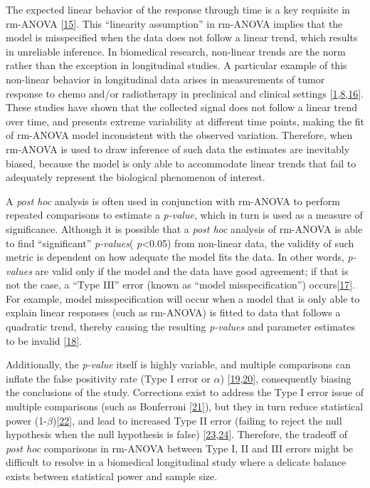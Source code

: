 \documentclass[
]{article}
\begin{document}
The expected linear behavior of the response through time is a key requisite in rm-ANOVA {[}\protect\hyperlink{ref-pinheiro2006}{15}{]}. This ``linearity assumption'' in rm-ANOVA implies that the model is misspecified when the data does not follow a linear trend, which results in unreliable inference. In biomedical research, non-linear trends are the norm rather than the exception in longitudinal studies. A particular example of this non-linear behavior in longitudinal data arises in measurements of tumor response to chemo and/or radiotherapy in preclinical and clinical settings {[}\protect\hyperlink{ref-roblyer2011}{1},\protect\hyperlink{ref-skala2010}{8},\protect\hyperlink{ref-vishwanath2009}{16}{]}. These studies have shown that the collected signal does not follow a linear trend over time, and presents extreme variability at different time points, making the fit of rm-ANOVA model inconsistent with the observed variation. Therefore, when rm-ANOVA is used to draw inference of such data the estimates are inevitably biased, because the model is only able to accommodate linear trends that fail to adequately represent the biological phenomenon of interest.

A \emph{post hoc} analysis is often used in conjunction with rm-ANOVA to perform repeated comparisons to estimate a \emph{p-value}, which in turn is used as a measure of significance.
Although it is possible that a \emph{post hoc} analysis of rm-ANOVA is able to find ``significant'' \emph{p-values}( \emph{p}\textless0.05) from non-linear data, the validity of such metric is dependent on how adequate the model fits the data. In other words, \emph{p-values} are valid only if the model and the data have good agreement; if that is not the case, a ``Type III'' error (known as ``model misspecification'') occurs{[}\protect\hyperlink{ref-dennis2019}{17}{]}. For example, model misspecification will occur when a model that is only able to explain linear responses (such as rm-ANOVA) is fitted to data that follows a quadratic trend, thereby causing the resulting \emph{p-values} and parameter estimates to be invalid {[}\protect\hyperlink{ref-wang2019}{18}{]}.

Additionally, the \emph{p-value} itself is highly variable, and multiple comparisons can inflate the false positivity rate (Type I error or \(\alpha\)) {[}\protect\hyperlink{ref-liu2010}{19},\protect\hyperlink{ref-halsey2015}{20}{]}, consequently biasing the conclusions of the study. Corrections exist to address the Type I error issue of multiple comparisons (such as Bonferroni {[}\protect\hyperlink{ref-abdi2010}{21}{]}), but they in turn reduce statistical power (1-\(\beta\)){[}\protect\hyperlink{ref-nakagawa2004}{22}{]}, and lead to increased Type II error (failing to reject the null hypothesis when the null hypothesis is false) {[}\protect\hyperlink{ref-gelman2012}{23},\protect\hyperlink{ref-albers2019}{24}{]}. Therefore, the tradeoff of \emph{post hoc} comparisons in rm-ANOVA between Type I, II and III errors might be difficult to resolve in a biomedical longitudinal study where a delicate balance exists between statistical power and sample size.
\end{document}
